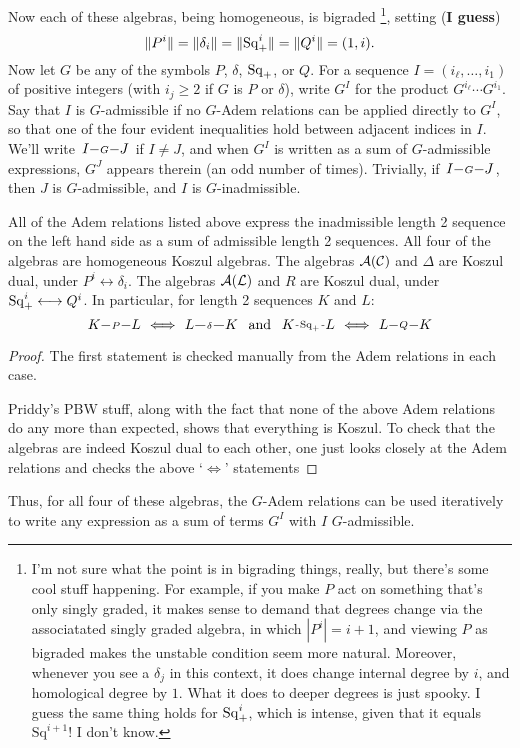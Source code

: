 \documentclass[10pt]{article}
\makeatletter
\newcommand{\produces}[3]{{#1}{#3}{#2}}
\renewcommand{\Q}{Q}
\newcommand{\SqShift}{\Sq_{\smash{+}}}
\newcommand{\Sq}{\mathrm{Sq}}
\newcommand{\Comm}{\calC}
\newcommand{\LieSteen}{\calA(\calL)}
\newcommand{\CommSteen}{\calA(\Comm)}
\renewcommand{\produces}[3]{
{
\def\labelstyle{\scriptstyle}
\xymatrix@C=2em@1{
{#1}
\ar@{-}[r]|-{{\,#3\,}}
&%
{#2}%
}}}
\makeatother
\begin{document}
\begin{SteenrodAlgebrasAndTheirKoszulDuals}
Now each of these algebras, being homogeneous, is bigraded%
\footnote{I'm not sure what the point is in bigrading things, really, but there's some cool stuff happening. For example, if you make $P$ act on something that's only singly graded, it makes sense to demand that degrees change via the associatated singly graded algebra, in which $|P^i|=i+1$, and viewing $P$ as bigraded makes the unstable condition seem more natural. Moreover, whenever you see a $\delta_j$ in this context, it does change internal degree by $i$, and homological degree by $1$. What it does to deeper degrees is just spooky. I guess the same thing holds for $\SqShift^i$, which is intense, given that it equals $\Sq^{i+1}$! I don't know.}, setting (\textbf{I guess}) 
\[\|P^i\|=\|\delta_i\|=\|\SqShift^i\|=\|\Q^i\|=(1,i).\]
Now let $G$ be any of the symbols $P$, $\delta$, $\SqShift$, or $\Q$. For a sequence $I=(i_{\ell},\ldots,i_1)$ of positive integers (with $i_j\geq2$ if $G$ is $P$ or $\delta$), write $G^I$ for the product $G^{i_\ell}\cdots G^{i_1}$. Say that $I$ is $G$-admissible if no $G$-Adem relations can be applied directly to $G^I$, so that one of the four evident inequalities hold between adjacent indices in $I$. We'll write $\produces{I}{J}{G}$ if $I\neq J$, and when $G^I$ is written as a sum of $G$-admissible expressions, $G^J$ appears therein (an odd number of times). Trivially, if $\produces{I}{J}{G}$, then $J$ is $G$-admissible, and $I$ is $G$-inadmissible.
\begin{lem}
All of the Adem relations listed above express the inadmissible length 2 sequence on the left hand side as a sum of admissible length 2 sequences. All four of the algebras are homogeneous Koszul algebras. The algebras $\CommSteen$ and $\Delta$ are Koszul dual, under $P^i\longleftrightarrow\delta_i$. The algebras $\LieSteen$ and $R$ are Koszul dual, under $\SqShift^i\longleftrightarrow\Q^i$. In particular, for length 2 sequences $K$ and $L$:
\[\produces{K}{L}{P}\iff\produces{L}{K}{\delta}\textup{ \ and \ }\produces{K}{L}{\SqShift}\iff\produces{L}{K}{\Q}\]
\end{lem}
\begin{proof}
The first statement is checked manually from the Adem relations in each case.

Priddy's PBW stuff, along with the fact that none of the above Adem relations do any more than expected, shows that everything is Koszul. To check that the algebras are indeed Koszul dual to each other, one just looks closely at the Adem relations and checks the above `$\iff$' statements
\end{proof}
Thus, for all four of these algebras, the $G$-Adem relations can be used iteratively to write any expression as a sum of terms $G^I$ with $I$ $G$-admissible. 


\end{SteenrodAlgebrasAndTheirKoszulDuals}
\end{document}
